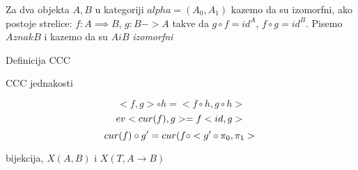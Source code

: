 \begin{definition}
  Za dva objekta $A, B$ u kategoriji $alpha = (A_0, A_1)$ kazemo da su izomorfni, ako postoje strelice: $f : A \implies B$, $g : B -> A$ takve da $g \circ f = id^A$, $f \circ g = id^B$. Pisemo $A znak B$ i kazemo da su $A i B$ \emph{izomorfni}
\end{definition}

\begin{definition}
  Definicija CCC
\end{definition}

\begin{lema}
  CCC jednakosti

  \begin{equation*}
  <f, g> \circ h = <f \circ h, g \circ h>
  \end{equation*}
  \begin{equation*}
  ev<cur(f), g> = f<id, g> \\
  \end{equation*}
  \begin{equation*}
  cur(f) \circ g' = cur (f \circ <g' \circ \pi_0, \pi_1> \\
  \end{equation*}
\end{lema}

\begin{lema}
  bijekcija, $X(A, B)$ i $X(T, A \to B)$
\end{lema}

